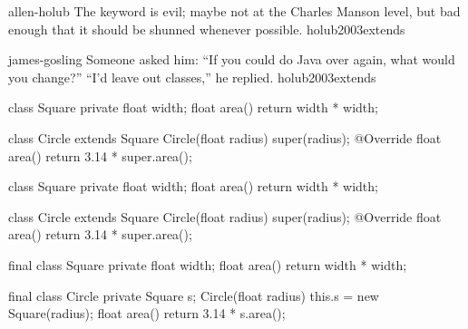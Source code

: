 \documentclass{article}
\begin{document}
\lnQuote
  {allen-holub}
  {The  keyword is evil; maybe not at the Charles Manson level, but bad enough that it should be shunned whenever possible.}
  {holub2003extends}

\lnQuote
  {james-gosling}
  {Someone asked him: ``If you could do Java over again, what would you change?'' ``I'd leave out classes,'' he replied.}
  {holub2003extends}

\begin{lnSnippet}
class Square
  private float width;
  float area()
    return width * width;

class Circle extends Square
  Circle(float radius)
    super(radius);
  @Override float area()
    return 3.14 * super.area();
\end{lnSnippet}


\begin{lnSnippet}
class Square
  private float width;
  float area()
    return width * width;

class Circle extends Square
  Circle(float radius)
    super(radius);
  @Override float area()
    return 3.14 * super.area();
\end{lnSnippet}
\begin{lnSnippet}
final class Square
  private float width;
  float area()
    return width * width;

final class Circle
  private Square s;
  Circle(float radius)
    this.s = new Square(radius);
  float area()
    return 3.14 * s.area();
\end{lnSnippet}
\end{document}
